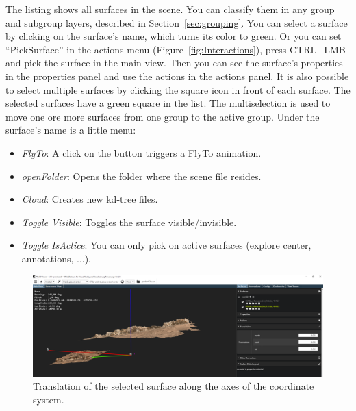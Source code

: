 The listing shows all surfaces in the scene. You can classify them in any group and subgroup layers, described in Section~\ref{sec:grouping}.
You can select a surface by clicking on the surface's name, which turns its color to green. Or you can set ``PickSurface'' in the actions menu (Figure~\ref{fig:Interactions}), press CTRL+LMB and pick the surface in the main view. Then you can see the surface's properties in the properties panel and use the actions in the actions panel. 
It is also possible to select multiple surfaces by clicking the square icon in front of each surface. The selected surfaces have a green square in the list. The multiselection is used to move one ore more surfaces from one group to the active group.
Under the surface's name is a little menu:
\begin{itemize}
	\item \textit{FlyTo}: A click on the button triggers a FlyTo animation.
	\item \textit{openFolder}: Opens the folder where the scene file resides.	
	\item \textit{Cloud}: Creates new kd-tree files.	
	\item \textit{Toggle Visible}: Toggles the surface visible/invisible.	
	\item \textit{Toggle IsActice}: You can only pick on active surfaces (explore center, annotations, ...).
	
\end{itemize}

\begin{figure}[h]
    	\centering
    		\includegraphics[width=1\textwidth]{pics/SurfaceTranslation.png}
    	\caption[Surface Translation]{Translation of the selected surface along the axes of the coordinate system.}
    	\label{fig:surfaceTranslation}
   \end{figure}

